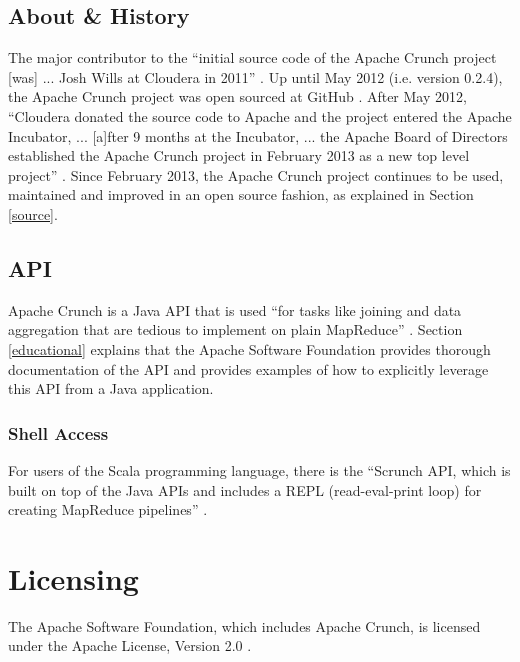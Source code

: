 \documentclass[9pt,twocolumn,twoside]{../../styles/osajnl}
\begin{document}
\subsection{About \& History} \label{about}
The major contributor to the ``initial source code of the Apache Crunch project [was] ... Josh Wills at Cloudera in 2011'' \cite{www-crunch-about}.
Up until May 2012 (i.e. version 0.2.4), the Apache Crunch project was open sourced at GitHub \CE \cite{www-crunch-about}.
 After May 2012, ``Cloudera donated the source code to Apache and the project entered the Apache Incubator, ... [a]fter 9 months at the Incubator, ...
the Apache Board of Directors established the Apache Crunch project in February 2013 as a new top level project'' \cite{www-crunch-about}.
Since February 2013, the Apache Crunch project continues to be used, maintained and improved in an open source fashion, as explained in Section \ref{source}.


\subsection{API} \label{api}
Apache Crunch is a Java API that is used ``for tasks like joining and
data aggregation that are tedious to implement on plain MapReduce''
\cite{www-crunch-api}. Section \ref{educational}
explains that the
Apache Software Foundation provides thorough documentation of the API
and provides examples of how to explicitly leverage this API from a
Java application.

\subsubsection{Shell Access} \label{shell}
For users of the Scala programming language, there is the ``Scrunch
API, which is built on top of the Java APIs and includes a REPL
(read-eval-print loop) for creating MapReduce pipelines''
\cite{www-crunch-api}.

\section{Licensing} \label{licensing}
The Apache Software Foundation, which includes Apache Crunch, is
licensed under the Apache License, Version 2.0 \cite{www-apache-lic}.
\end{document}
